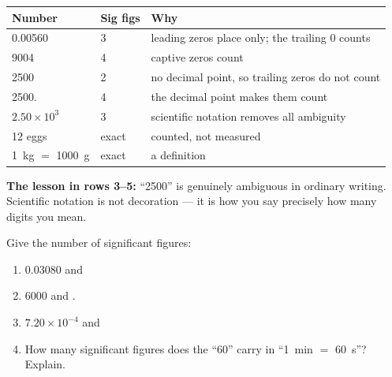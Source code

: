 \documentclass{apchem-worksheet}
\begin{document}
\begin{workedexample}
\begin{center}
\renewcommand{\arraystretch}{1.2}
\begin{tabular}{@{}lll@{}}
\hline
\textbf{Number} & \textbf{Sig figs} & \textbf{Why} \\
\hline
0.00560         & 3 & leading zeros place only; the trailing 0 counts \\
9004            & 4 & captive zeros count \\
2500            & 2 & no decimal point, so trailing zeros do not count \\
2500.           & 4 & the decimal point makes them count \\
$2.50\times10^{3}$ & 3 & scientific notation removes all ambiguity \\
12 eggs         & exact & counted, not measured \\
\SI{1}{\kilo\gram} $=$ \SI{1000}{\gram} & exact & a definition \\
\hline
\end{tabular}
\end{center}

\textbf{The lesson in rows 3--5:} ``2500'' is genuinely ambiguous in
ordinary writing. Scientific notation is not decoration --- it is how you
say precisely how many digits you mean.
\end{workedexample}

\begin{yourturn}
Give the number of significant figures:
\begin{enumerate}[leftmargin=*,itemsep=0.5em]
  \item 0.03080 \quad and  \workspace[1.2cm]
  \item 6000 \quad and . \workspace[1.2cm]
  \item $7.20\times10^{-4}$ \quad and  \workspace[1.2cm]
  \item How many significant figures does the ``60'' carry in
        ``\SI{1}{\minute} $=$ \SI{60}{\second}''? Explain.
        \workspace[1.4cm]
\end{enumerate}
\end{yourturn}
\end{document}
